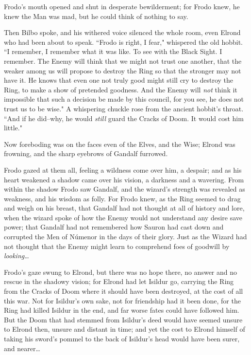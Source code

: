 Frodo's mouth opened and shut in desperate bewilderment; for Frodo knew, he knew the Man was mad, but he could think of nothing to say.

Then Bilbo spoke, and his withered voice silenced the whole room, even Elrond who had been about to speak. ``Frodo is right, I fear," whispered the old hobbit. ``I remember, I remember what it was like. To see with the Black Sight. I remember. The Enemy will think that we might not trust one another, that the weaker among us will propose to destroy the Ring so that the stronger may not have it. He knows that even one not truly good might still cry to destroy the Ring, to make a show of pretended goodness. And the Enemy will \emph{not} think it impossible that such a decision be made by this council, for you see, he does not trust us to be wise." A whispering chuckle rose from the ancient hobbit's throat. ``And if he did\---why, he would \emph{still} guard the Cracks of Doom. It would cost him little."

Now foreboding was on the faces even of the Elves, and the Wise; Elrond was frowning, and the sharp eyebrows of Gandalf furrowed.

Frodo gazed at them all, feeling a wildness come over him, a despair; and as his heart weakened a shadow came over his vision, a darkness and a wavering. From within the shadow Frodo saw Gandalf, and the wizard's strength was revealed as weakness, and his wisdom as folly. For Frodo knew, as the Ring seemed to drag and weigh on his breast, that Gandalf had not thought at all of history and lore, when the wizard spoke of how the Enemy would not understand any desire save power; that Gandalf had not remembered how Sauron had cast down and corrupted the Men of Númenor in the days of their glory. Just as the Wizard had not thought that the Enemy might learn to comprehend foes of goodwill by \emph{looking{\ldots}}

Frodo's gaze swung to Elrond, but there was no hope there, no answer and no rescue in the shadowy vision; for Elrond had let Isildur go, carrying the Ring from the Cracks of Doom where it should have been destroyed, at the cost of all this war. Not for Isildur's own sake, not for friendship had it been done, for the Ring had killed Isildur in the end, and far worse fates could have followed him. But the Doom that had stemmed from Isildur's deed would have seemed unsure to Elrond then, unsure and distant in time; and yet the cost to Elrond himself of taking his sword's pommel to the back of Isildur's head would have been surer, and nearer{\ldots}

